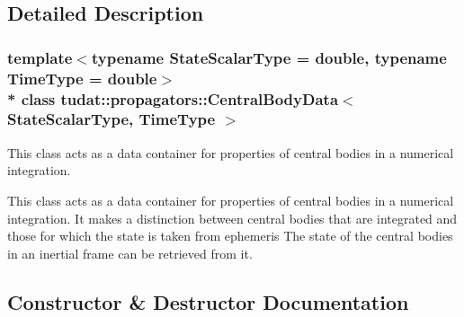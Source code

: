 \subsection{Detailed Description}
\subsubsection*{template$<$typename State\+Scalar\+Type = double, typename Time\+Type = double$>$\\*
class tudat\+::propagators\+::\+Central\+Body\+Data$<$ State\+Scalar\+Type, Time\+Type $>$}

This class acts as a data container for properties of central bodies in a numerical integration. 

This class acts as a data container for properties of central bodies in a numerical integration. It makes a distinction between central bodies that are integrated and those for which the state is taken from ephemeris The state of the central bodies in an inertial frame can be retrieved from it. 

\subsection{Constructor \& Destructor Documentation}
